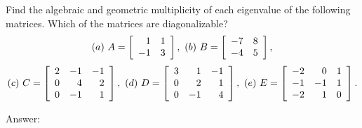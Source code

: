 \documentclass{ximera}
\author{Zack Reed}
\begin{document}
\begin{problem}
  Find the algebraic and geometric multiplicity of each eigenvalue of
  the following matrices. Which of the matrices are diagonalizable?
  \begin{equation*}
    (a)\quad
    A = \startmat{rr} 1 & 1 \\ -1 & 3 \stopmat,
    \quad
    (b)\quad
    B = \startmat{rr} -7 & 8 \\ -4 & 5 \stopmat,
  \end{equation*}
  \begin{equation*}
    (c)\quad
    C = \startmat{rrr}
      2 & -1 & -1 \\
      0 & 4 & 2 \\
      0 & -1 & 1 \\
    \stopmat,
    \quad
    (d)\quad
    D = \startmat{rrr}
      3 & 1 & -1 \\
      0 & 2 & 1 \\
      0 & -1 & 4 \\
    \stopmat,
    \quad
    (e)\quad
    E = \startmat{rrr}
      -2 & 0 & 1 \\
      -1 & -1 & 1 \\
      -2 & 1 & 0 \\
    \stopmat.
  \end{equation*}

  Answer:


\end{problem}
\end{document}
